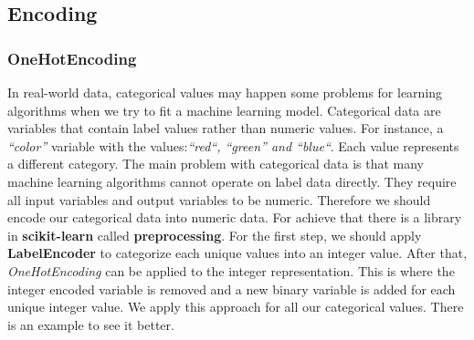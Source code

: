 \documentclass[onecolumn]{article}
\begin{document}
\subsection{Encoding}
\subsubsection{OneHotEncoding}
In real-world data, categorical values may happen some problems for learning algorithms when we try to fit a machine learning model. Categorical data are variables that contain label values rather than numeric values. For instance, a \emph{“color”} variable with the values:\emph{“red“, “green” and “blue“}. Each value represents a different category. The main problem with categorical data is that many machine learning algorithms cannot operate on label data directly. They require all input variables and output variables to be numeric. Therefore we should encode our categorical data into numeric data. For achieve that there is a library in \textbf{scikit-learn} called \textbf{preprocessing}. For the first step, we should apply \textbf{LabelEncoder} to categorize each unique values into an integer value. After that, \emph{OneHotEncoding} can be applied to the integer representation. This is where the integer encoded variable is removed and a new binary variable is added for each unique integer value.
We apply this approach for all our categorical values. There is an example to see it better.
\end{document}
